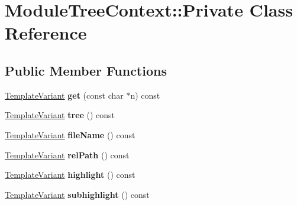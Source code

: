 \hypertarget{class_module_tree_context_1_1_private}{}\section{Module\+Tree\+Context\+::Private Class Reference}
\label{class_module_tree_context_1_1_private}
\subsection*{Public Member Functions}
\begin{DoxyCompactItemize}
\item 
\mbox{\label{class_module_tree_context_1_1_private_aedac9eb956df68250cb60966106d4fea}} 
\mbox{\hyperlink{class_template_variant}{Template\+Variant}} {\bfseries get} (const char $\ast$n) const
\item 
\mbox{\label{class_module_tree_context_1_1_private_a79b860137f9c70428033d9026199e87b}} 
\mbox{\hyperlink{class_template_variant}{Template\+Variant}} {\bfseries tree} () const
\item 
\mbox{\label{class_module_tree_context_1_1_private_a605735e00926570af9153f9613cdf0cc}} 
\mbox{\hyperlink{class_template_variant}{Template\+Variant}} {\bfseries file\+Name} () const
\item 
\mbox{\label{class_module_tree_context_1_1_private_a8a2aad327bc9ad04d4dfe8088a4415cd}} 
\mbox{\hyperlink{class_template_variant}{Template\+Variant}} {\bfseries rel\+Path} () const
\item 
\mbox{\label{class_module_tree_context_1_1_private_a07348e0a26f3605ccd241f473f2e7853}} 
\mbox{\hyperlink{class_template_variant}{Template\+Variant}} {\bfseries highlight} () const
\item 
\mbox{\label{class_module_tree_context_1_1_private_a401740cadac3a309f2e133d511bee72d}} 
\mbox{\hyperlink{class_template_variant}{Template\+Variant}} {\bfseries subhighlight} () const
\item 
\mbox{\label{class_module_tree_context_1_1_private_a011b471bef25d0bd563c645a23c96932}} 

\end{DoxyCompactItemize}
